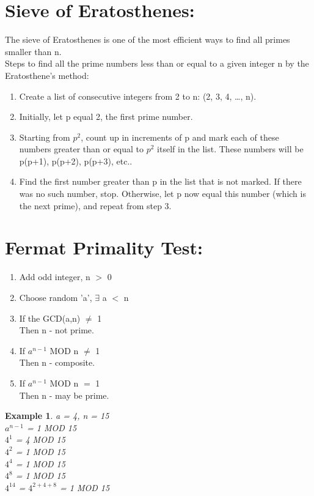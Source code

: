 \documentclass{article}
\newtheorem{ex}{Example}[section]
\begin{document}
\section{Sieve of Eratosthenes:}
The sieve of Eratosthenes is one of the most efficient ways to find all primes smaller than n.
\\Steps to find all the prime numbers less than or equal to a given integer n by the Eratosthene’s method:
\begin{enumerate}
    \item Create a list of consecutive integers from 2 to n: (2, 3, 4, …, n).
    \item Initially, let p equal 2, the first prime number.
    \item Starting from $p^{2}$, count up in increments of p and mark each of these numbers greater than or equal to $p^{2}$ itself in the list. These numbers will be p(p+1), p(p+2), p(p+3), etc..
    \item Find the first number greater than p in the list that is not marked. If there was no such number, stop. Otherwise, let p now equal this number (which is the next prime), and repeat from step 3.
\end{enumerate}

\section{Fermat Primality Test:}
\begin{enumerate}
    \item Add odd integer, n $>$ 0
    \item Choose random 'a', $\exists$ a $<$ n
    \item If the GCD(a,n) $\neq$ 1
    \\ Then n - not prime.
    \item If $a^{n-1}$ MOD n $\neq$ 1
    \\ Then n - composite.
    \item If $a^{n-1}$ MOD n $=$ 1
    \\ Then n - may be prime.
\end{enumerate}
\begin{ex}
a = 4, n = 15
\\ $a^{n-1}$ = 1 MOD 15
\\ $4^{1}$ = 4 MOD 15
\\ $4^{2}$ = 1 MOD 15
\\ $4^{4}$ = 1 MOD 15
\\ $4^{8}$ = 1 MOD 15
\\ $4^{14}$ = $4^{2+4+8}$ = 1 MOD 15
\end{ex}
\end{document}
